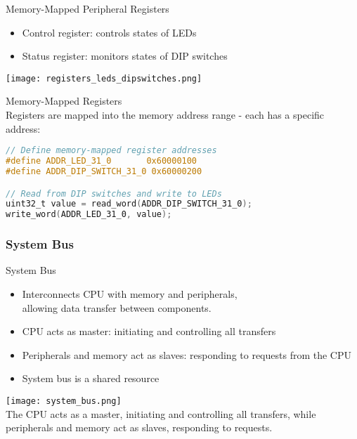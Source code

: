 \begin{definition}{Memory-Mapped Peripheral Registers}
    \begin{itemize}
        \item Control register: controls states of LEDs
        \item Status register: monitors states of DIP switches
    \end{itemize}
    \vspace{1mm}
    \texttt{[image: registers\_leds\_dipswitches.png]}
\end{definition}

\multend

\begin{code}{Memory-Mapped Registers}\\
Registers are mapped into the memory address range - each has a specific address:
\begin{lstlisting}[language=C, style=basesmol]
// Define memory-mapped register addresses
#define ADDR_LED_31_0       0x60000100
#define ADDR_DIP_SWITCH_31_0 0x60000200

// Read from DIP switches and write to LEDs
uint32_t value = read_word(ADDR_DIP_SWITCH_31_0);
write_word(ADDR_LED_31_0, value);
\end{lstlisting}
\end{code}


\subsubsection{System Bus}


\begin{definition}{System Bus}
    \begin{itemize}
        \item Interconnects CPU with memory and peripherals, \\allowing data transfer between components.
        \item CPU acts as master: initiating and controlling all transfers
        \item Peripherals and memory act as slaves: responding to requests from the CPU
        \item System bus is a shared resource
    \end{itemize}
    \texttt{[image: system\_bus.png]}\\
    The CPU acts as a master, initiating and controlling all transfers, while peripherals and memory act as slaves, responding to requests.
\end{definition}



